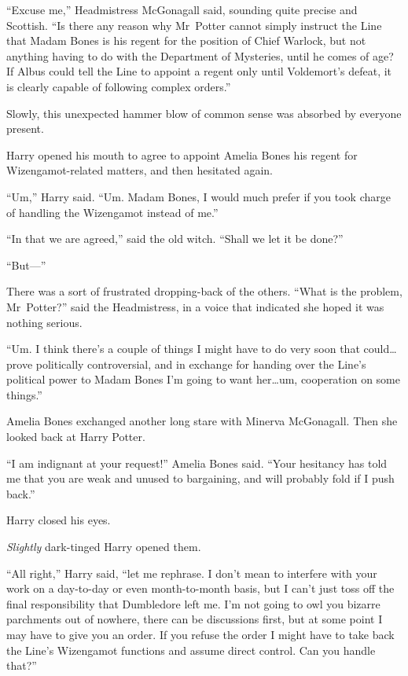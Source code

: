 “Excuse me,” Headmistress McGonagall said, sounding quite precise and Scottish. “Is there any reason why Mr~Potter cannot simply instruct the Line that Madam Bones is his regent for the position of Chief Warlock, but not anything having to do with the Department of Mysteries, until he comes of age? If Albus could tell the Line to appoint a regent only until Voldemort’s defeat, it is clearly capable of following complex orders.”

Slowly, this unexpected hammer blow of common sense was absorbed by everyone present.

Harry opened his mouth to agree to appoint Amelia Bones his regent for Wizengamot-related matters, and then hesitated again.

“Um,” Harry said. “Um. Madam Bones, I would much prefer if you took charge of handling the Wizengamot instead of me.”

“In that we are agreed,” said the old witch. “Shall we let it be done?”

“But—”

There was a sort of frustrated dropping-back of the others. “What is the problem, Mr~Potter?” said the Headmistress, in a voice that indicated she hoped it was nothing serious.

“Um. I think there’s a couple of things I might have to do very soon that could…prove politically controversial, and in exchange for handing over the Line’s political power to Madam Bones I’m going to want her…um, cooperation on some things.”

Amelia Bones exchanged another long stare with Minerva McGonagall. Then she looked back at Harry Potter.

“I am indignant at your request!” Amelia Bones said. “Your hesitancy has told me that you are weak and unused to bargaining, and will probably fold if I push back.”

Harry closed his eyes.

\emph{Slightly} dark-tinged Harry opened them.

“All right,” Harry said, “let me rephrase. I don’t mean to interfere with your work on a day-to-day or even month-to-month basis, but I can’t just toss off the final responsibility that Dumbledore left me. I’m not going to owl you bizarre parchments out of nowhere, there can be discussions first, but at some point I may have to give you an order. If you refuse the order I might have to take back the Line’s Wizengamot functions and assume direct control. Can you handle that?”


